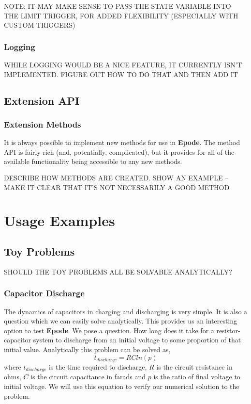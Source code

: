 \documentclass[letterpaper,10pt]{book}
\newcommand{\epode}[0]{\textbf{Epode}}
\begin{document}
	NOTE: IT MAY MAKE SENSE TO PASS THE STATE VARIABLE INTO THE LIMIT TRIGGER, FOR ADDED FLEXIBILITY (ESPECIALLY WITH CUSTOM TRIGGERS)
	
    \section{Logging}
    WHILE LOGGING WOULD BE A NICE FEATURE, IT CURRENTLY ISN'T IMPLEMENTED.  FIGURE OUT HOW TO DO THAT AND THEN ADD IT

  \chapter{Extension API}
    \section{Extension Methods}
      It is always possible to implement new methods for use in \epode{}.  The method API is fairly rich (and, potentially, complicated), but it provides for all of the available functionality being accessible to any new methods.
      
      DESCRIBE HOW METHODS ARE CREATED. SHOW AN EXAMPLE -- MAKE IT CLEAR THAT IT'S NOT NECESSARILY A GOOD METHOD
      
  
\part{Usage Examples}

  \chapter{Toy Problems}
    SHOULD THE TOY PROBLEMS ALL BE SOLVABLE ANALYTICALLY?
    
    \section{Capacitor Discharge}
      The dynamics of capacitors in charging and discharging is very simple.  It is also a question which we can easily solve analytically.  This provides us an interesting option to test \epode{}.  We pose a question.  How long does it take for a resistor-capacitor system to discharge from an initial voltage to some proportion of that initial value.  Analytically this problem can be solved as,
      \begin{equation}
	t_{discharge} = R Cln(p)
      \end{equation}
      where $t_{discharge}$ is the time required to discharge, $R$ is the circuit resistance in ohms, $C$ is the circuit capacitance in farads and $p$ is the ratio of final voltage to initial voltage.  We will use this equation to verify our numerical solution to the problem.
      
\end{document}
